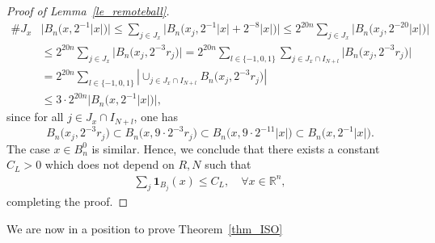 \documentclass[12pt]{amsart}
\theoremstyle{plain}
\theoremstyle{definition}
\numberwithin{equation}{section}
\begin{document}
\begin{proof}[Proof of Lemma~\ref{le_remoteball}]
\begin{align*}
    \# J_x &\big|B_n\big(x,2^{-1}|x| \big)\big| \le \sum_{j \in J_x} \big|B_n \big(x_j, 2^{-1}|x|+2^{-8}|x|\big)\big| \le 2^{20n} \sum_{j\in J_x} \big|B_n \big(x_j, 2^{-20}|x|\big) \big|\\
    &\le 2^{20n} \sum_{j\in J_x} \big|B_n\big(x_j, 2^{-3}r_j\big)\big| = 2^{20n} \sum_{l\in \{-1,0,1\}} \sum_{j \in J_x \cap I_{N+l}} \big|B_n\big(x_j, 2^{-3}r_j\big)\big| \\
    &=2^{20n} \sum_{l\in \{-1,0,1\}} \left|\cup_{j \in J_x\cap I_{N+l}}B_n\big(x_j, 2^{-3} r_j\big)\right|\\
    &\le 3 \cdot 2^{20n} \big|B_n\big(x, 2^{-1}|x|\big)\big|,
\end{align*}
since for all $j \in J_x\cap I_{N+l}$, one has $$B_n\big(x_j, 2^{-3} r_j\big) \subset B_n\big(x,9 \cdot 2^{-3} r_j\big) \subset B_n \big(x, 9\cdot 2^{-11} |x| \big) \subset B_n\big(x, 2^{-1}|x|\big).$$ 
The case $x\in B_n^0$ is similar. Hence, we conclude that there exists a constant $C_L>0$ which does not depend on $R,N$ such that
\begin{align*}
    \sum_j \mathbf{1}_{B_j}(x) \le C_L,\quad \forall x\in \mathbb{R}^n,
\end{align*}
completing the proof.
\end{proof}






We are now in a position to prove Theorem~\ref{thm_ISO}
\end{document}
